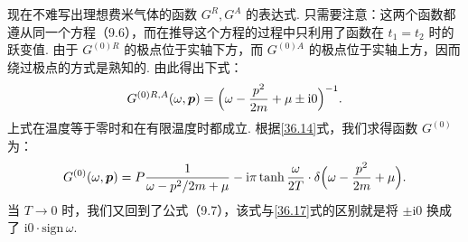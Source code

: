 现在不难写出理想费米气体的函数 $G^{R},G^{A}$ 的表达式. 只需要注意：这两个函数都遵从同一个方程（9.6），而在推导这个方程的过程中只利用了函数在 $t_1=t_2$ 时的跃变值. 由于 $G^{(0)R}$ 的极点位于实轴下方，而 $G^{(0)A}$ 的极点位于实轴上方，因而绕过极点的方式是熟知的. 由此得出下式：
\begin{equation}
G^{(0)R,A}(\omega,\bm p)=\Bigl(\omega-\frac{p^{2}}{2m}+\mu\pm\mathrm{i}0\Bigr)^{-1}.
\label{36.17}
\end{equation}
上式在温度等于零时和在有限温度时都成立. 根据\eqref{36.14}式，我们求得函数 $G^{(0)}$ 为：
\begin{equation}
G^{(0)}(\omega,\bm p)=P\frac{1}{\omega-p^{2}/2m+\mu}
-\mathrm{i}\pi\tanh\frac{\omega}{2T}\cdot\delta\Bigl(\omega-\frac{p^{2}}{2m}+\mu\Bigr).
\label{36.18}
\end{equation}
当 $T\to 0$ 时，我们又回到了公式（9.7），该式与\eqref{36.17}式的区别就是将 $\pm\mathrm{i}0$ 换成了 $\mathrm{i}0\cdot\mathrm{sign}\,\omega$.

